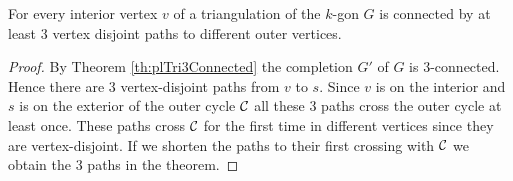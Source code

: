 \begin{thrm}
  \label{th:triOfK3:VertexDisjointPaths}
  For every interior vertex $v$ of a triangulation of the $k$-gon $G$ is connected by at least $3$ vertex disjoint paths to different outer vertices.
\end{thrm}
\begin{proof}
By Theorem \ref{th:plTri3Connected} the completion $G'$ of $G$ is $3$-connected. Hence there are 3 vertex-disjoint paths from $v$ to $s$. Since $v$ is on the interior and $s$ is on the exterior of the outer cycle $\mathcal{C}$ all these 3 paths cross the outer cycle at least once. These paths cross $\mathcal{C}$ for the first time in different vertices since they are vertex-disjoint. If we shorten the paths to their first crossing with $\mathcal{C}$ we obtain the $3$ paths in the theorem.
\end{proof}

